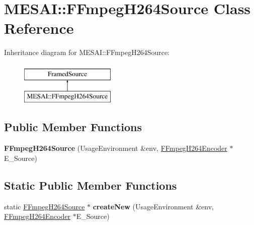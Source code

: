 \hypertarget{class_m_e_s_a_i_1_1_f_fmpeg_h264_source}{}\section{M\+E\+S\+AI\+:\+:F\+Fmpeg\+H264\+Source Class Reference}
\label{class_m_e_s_a_i_1_1_f_fmpeg_h264_source}
Inheritance diagram for M\+E\+S\+AI\+:\+:F\+Fmpeg\+H264\+Source\+:\begin{figure}[H]
\begin{center}
\leavevmode
\includegraphics[height=2.000000cm]{d5/d44/class_m_e_s_a_i_1_1_f_fmpeg_h264_source}
\end{center}
\end{figure}
\subsection*{Public Member Functions}
\begin{DoxyCompactItemize}
\item 
\mbox{\label{class_m_e_s_a_i_1_1_f_fmpeg_h264_source_a016ab12aa100999b35fd9a4d35fd17df}} 
{\bfseries F\+Fmpeg\+H264\+Source} (Usage\+Environment \&env, \hyperlink{class_m_e_s_a_i_1_1_f_fmpeg_h264_encoder}{F\+Fmpeg\+H264\+Encoder} $\ast$E\+\_\+\+Source)
\end{DoxyCompactItemize}
\subsection*{Static Public Member Functions}
\begin{DoxyCompactItemize}
\item 
\mbox{\label{class_m_e_s_a_i_1_1_f_fmpeg_h264_source_a7f9f2e3889579dac315e0ede519e1c12}} 
static \hyperlink{class_m_e_s_a_i_1_1_f_fmpeg_h264_source}{F\+Fmpeg\+H264\+Source} $\ast$ {\bfseries create\+New} (Usage\+Environment \&env, \hyperlink{class_m_e_s_a_i_1_1_f_fmpeg_h264_encoder}{F\+Fmpeg\+H264\+Encoder} $\ast$E\+\_\+\+Source)
\end{DoxyCompactItemize}
